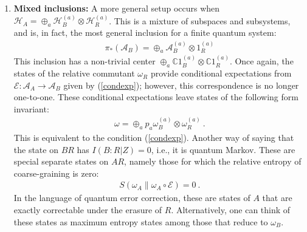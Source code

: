 \documentclass[a4paper,11pt]{article}
\theoremstyle{definition}
\newcommand{\mA}{\mathcal{A}}
\newcommand{\mH}{\mathcal{H}}
\newcommand{\mE}{\mathcal{E}}
\begin{document}
\begin{enumerate}
There is a one-to-one correspondence between conditional expectations $\mE_{\omega_R}:\mA_A\to \mA_B$, and states of the relative commutant $\omega_R$:
    \begin{align}\label{condexp}
       \forall b\in \mA_B, r\in \mA_R:\qquad  \mE_{\omega_R}(b\otimes r)=b\: \omega_R(r)\ .
    \end{align}
A state is invariant under this coarse-graining if and only if it has no correlations between $B$ and $R$; i.e., $\omega_A=\omega_B\otimes \omega_R$. This is equivalent to saying $I_\omega(A:R)=0$, or 
\begin{align}
    \forall t\in\mathbb{R}, b\in\mA_B:\qquad \omega_A^{it} (b\otimes 1_R) \omega_A^{-it}= \omega_B^{it}b\omega_B^{-it}\otimes 1_R
\end{align}
    
This type of inclusion is natural in the multi-particle quantum systems we study here. In a many-body quantum system, we can have an increasing family of subsystems, e.g., half-lines in an infinite 1d spin chain or wedges in QFT, $W_i\leq W_{i+1}$; we have
$\mathcal{A}_{W_i}\subseteq\mathcal{A}_{W_{i+1}}$, giving a net of coarse observable subsystems. See Appendix (\ref{}) for a classical analog of subsystem nets in classical field theory. In this work, we focus in such inclusions.



\item {\bf Mixed inclusions:} A more general setup occurs when $\mH_A=\oplus_a \mH_B^{(a)}\otimes \mH_R^{(a)}$. This is a mixture of subspaces and subsystems, and is, in fact, the most general inclusion for a finite quantum system:
\begin{align}
\pi_*(\mA_B)=\oplus_a \mA_B^{(a)}\otimes 1_R^{(a)}  
\end{align}
This inclusion has a non-trivial center $\oplus_a \mathbb{C}1_B^{(a)}\otimes \mathbb{C}1_R^{(a)}$. Once again, the states of the relative commutant $\omega_R$ provide conditional expectations from $\mE:\mA_A\to \mA_B$ given by (\ref{condexp}); however, this correspondence is no longer one-to-one. These conditional expectations leave states of the following form invariant: 
\begin{align}
    \omega=\oplus_a p_a \omega_B^{(a)}\otimes \omega_R^{(a)}\ .
\end{align}
This is equivalent to the condition (\ref{condexp}). Another way of 
saying that the state on $BR$ has $I(B:R|Z)=0$, i.e., it is quantum Markov. These are special separate states on $AR$, namely those for which the relative entropy of coarse-graining is zero: 
\begin{align}
    S(\omega_A\|\omega_A\circ \mE)=0\ .
\end{align}
In the language of quantum error correction, these are states of $A$ that are exactly correctable under the erasure of $R$. Alternatively, one can think of these states as maximum entropy states among those that reduce to $\omega_B$. 
\end{enumerate}
\end{document}
